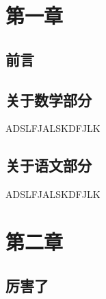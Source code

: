 \documentclass{ctexbook}
\begin{document}
 
\tableofcontents
 
\chapter{第一章}
\section{ 前言 }
 
\section{关于数学部分}
ADSLFJALSKDFJLK

\section{关于语文部分}
ADSLFJALSKDFJLK

\chapter{第二章}
\section{厉害了}


 
\end{document}

